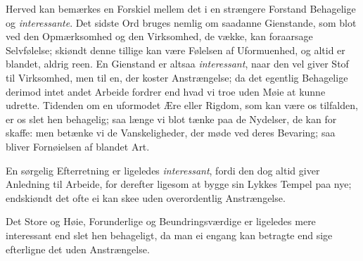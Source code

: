 \documentclass[12pt,a4paper]{article}
\newcommand{\opage}[1]{\marginnote{\footnotesize\textit{[#1]}}}
\begin{document}
Herved kan bemærkes en Forskiel mellem det i en strængere Forstand Behagelige og
\emph{interessante}. Det sidste Ord bruges nemlig om saadanne Gienstande, som blot ved den
Opmærksomhed og den Virksomhed, de vække, kan foraarsage Selvfølelse; skiøndt denne tillige
kan være Følelsen af Uformuenhed, og altid er blandet, aldrig reen. En Gienstand er altsaa
\emph{interessant}, naar den vel giver Stof til Virksomhed, men til en, der koster
Anstrængelse; da det egentlig Behagelige derimod intet andet Arbeide fordrer end hvad vi
troe uden Møie at kunne udrette. Tidenden om en uformodet Ære eller Rigdom, som kan være os
tilfalden, er os slet hen behagelig; saa længe vi blot tænke paa de Nydelser, de kan for%
\opage{210}skaffe: men betænke vi de Vanskeligheder, der møde ved deres Bevaring; saa bliver
Fornøielsen af blandet Art.

En sørgelig Efterretning er ligeledes \emph{interessant}, fordi den dog altid giver
Anledning til Arbeide, for derefter ligesom at bygge sin Lykkes Tempel paa nye; endskiøndt
det ofte ei kan skee uden overordentlig Anstrængelse.

Det Store og Høie, Forunderlige og Beundringsværdige er ligeledes mere interessant end
slet hen behageligt, da man ei engang kan betragte end sige efterligne det uden
Anstrængelse.
\end{document}
